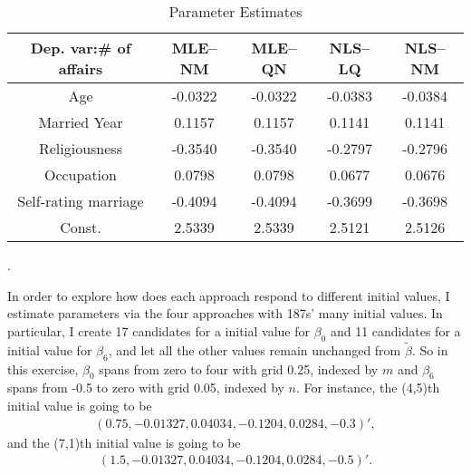 \documentclass[10pt, letterpaper]{article}
\begin{document}
\begin{table}[h!]
  \begin{center}
    \caption{Parameter Estimates}  
    \label{tab:estimate}
    \begin{tabular}{c|c|c|c|c} %
      \hline\hline
       Dep. var:\# of affairs  & MLE--NM      &   MLE--QN   &   NLS--LQ   &    NLS--NM       \\
      \hline
       Age                     & -0.0322     &  -0.0322     &    -0.0383  &   -0.0384    \\
       Married Year            &  0.1157     &    0.1157    &    0.1141   &    0.1141      \\
       Religiousness           &  -0.3540    &  -0.3540     &    -0.2797  &    -0.2796    \\     
       Occupation              &  0.0798     &    0.0798    &     0.0677  &   0.0676     \\  
       Self-rating marriage    &  -0.4094    &   -0.4094    &   -0.3699   &   -0.3698     \\
       Const.                  & 2.5339      &   2.5339     &    2.5121   &   2.5126  \\
      \hline      \hline
    \end{tabular}
  \end{center}
\end{table} 



\clearpage

. 

In order to explore how does each approach respond to different initial values, I estimate parameters via the four approaches with 187s' many initial values. In particular, I create 17 candidates for a initial value for $\beta_{0}$ and 11 candidates for a initial value for $\beta_{6}$, and let all the other values remain unchanged from $\tilde{\beta}$. So in this exercise, $\beta_{0}$ spans from zero to four with grid 0.25, indexed by $m$ and $\beta_{6}$ spans from -0.5 to zero with grid 0.05, indexed by $n$. For instance, the (4,5)th initial value is going to be
\begin{align}
 ( 0.75, -0.01327, 0.04034, -0.1204, 0.0284, -0.3)', \nonumber 
\end{align}
and the (7,1)th initial value is going to be
\begin{align}
 ( 1.5, -0.01327, 0.04034, -0.1204, 0.0284, -0.5)'. \nonumber
\end{align}
\end{document}
